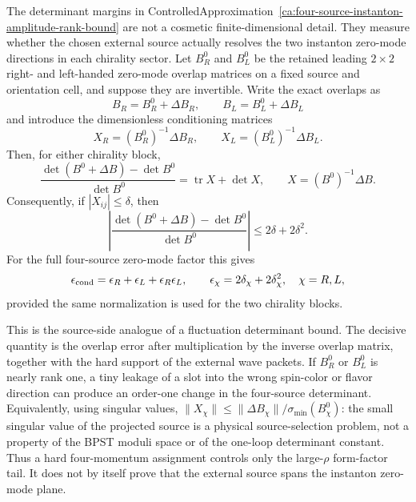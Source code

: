 \begin{controlledapproximation}
\label{ca:four-source-instanton-source-conditioning}
The determinant margins in
ControlledApproximation~\ref{ca:four-source-instanton-amplitude-rank-bound}
are not a cosmetic finite-dimensional detail.  They measure whether the
chosen external source actually resolves the two instanton zero-mode
directions in each chirality sector.  Let \(B_R^0\) and \(B_L^0\) be the
retained leading \(2\times2\) right- and left-handed zero-mode overlap
matrices on a fixed source and orientation cell, and suppose they are
invertible.  Write the exact overlaps as
\[
  B_R=B_R^0+\Delta B_R,\qquad B_L=B_L^0+\Delta B_L
\]
and introduce the dimensionless conditioning matrices
\begin{equation}
  X_R=(B_R^0)^{-1}\Delta B_R,\qquad
  X_L=(B_L^0)^{-1}\Delta B_L .
  \label{eq:four-source-conditioning-matrices}
\end{equation}
Then, for either chirality block,
\begin{equation}
  \frac{\det(B^0+\Delta B)-\det B^0}{\det B^0}
  =
  \operatorname{tr}X+\det X,
  \qquad
  X=(B^0)^{-1}\Delta B .
  \label{eq:four-source-conditioning-determinant-ratio}
\end{equation}
Consequently, if \(|X_{ij}|\le\delta\), then
\begin{equation}
  \left|
  \frac{\det(B^0+\Delta B)-\det B^0}{\det B^0}
  \right|
  \le
  2\delta+2\delta^2 .
  \label{eq:four-source-conditioning-relative-bound}
\end{equation}
For the full four-source zero-mode factor this gives
\begin{equation}
  \epsilon_{\rm cond}
  =
  \epsilon_R+\epsilon_L+\epsilon_R\epsilon_L,
  \qquad
  \epsilon_\chi=2\delta_\chi+2\delta_\chi^2,
  \quad \chi=R,L,
  \label{eq:four-source-conditioning-product-bound}
\end{equation}
provided the same normalization is used for the two chirality blocks.

This is the source-side analogue of a fluctuation determinant bound.  The
decisive quantity is the overlap error after multiplication by the inverse
overlap matrix, together with the hard support of the external wave packets.
If \(B_R^0\) or \(B_L^0\) is nearly rank one, a tiny leakage of a slot into the
wrong spin-color or flavor direction can produce an order-one change in the
four-source determinant.
Equivalently, using singular values,
\(\|X_\chi\|\le \|\Delta B_\chi\|/\sigma_{\min}(B_\chi^0)\): the small
singular value of the projected source is a physical source-selection
problem, not a property of the BPST moduli space or of the one-loop
determinant constant.  Thus a hard four-momentum assignment controls only the
large-\(\rho\) form-factor tail.  It does not by itself prove that the
external source spans the instanton zero-mode plane.
\end{controlledapproximation}

